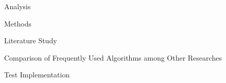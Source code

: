 \documentclass{matthijs}
\begin{document}
\begin{hoofdstuk}{Analysis}
\begin{paragraaf}{Methods}
\begin{subparagraaf}{Literature Study}
				\begin{figuur}{Comparison of Frequently Used Algorithms among Other Researches}
					\centerline{}
				\end{figuur}
			
			\end{subparagraaf}

			\begin{subparagraaf}{Test Implementation}


\end{subparagraaf}
\end{paragraaf}
\end{hoofdstuk}
\end{document}

